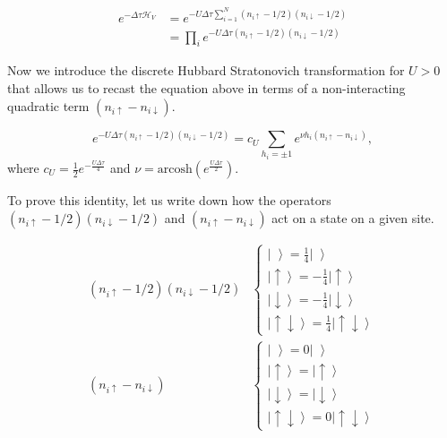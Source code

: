 \begin{equation}
\begin{split}
e^{-\Delta\tau \mathcal{H}_V} &= e^{-U \Delta\tau \sum_{i=1}^N (n_{i\uparrow} - 1/2 ) (n_{i\downarrow} - 1/2 )} \\
&= \prod_i e^{-U \Delta\tau (n_{i\uparrow} - 1/2 ) (n_{i\downarrow} - 1/2 )}
\end{split}
\end{equation}

Now we introduce the discrete Hubbard Stratonovich transformation for $U > 0$ that allows us to recast the equation above in terms of a non-interacting quadratic term $(n_{i\uparrow} - n_{i\downarrow} )$.

\begin{equation}\label{eq:discreteHS}
e^{-U \Delta\tau (n_{i\uparrow} - 1/2 ) (n_{i\downarrow} - 1/2 )} = c_U \sum_{h_i = \pm 1} e^{\nu h_i (n_{i\uparrow} - n_{i\downarrow} )},
\end{equation}
where $c_U = \frac{1}{2} e^{-\frac{U\Delta \tau}{4}}$ and $\nu = \text{arcosh} ( e^{\frac{U\Delta\tau}{2}})$.

To prove this identity, let us write down how the operators  $(n_{i\uparrow} - 1/2 ) (n_{i\downarrow} - 1/2 )$ and $(n_{i\uparrow} - n_{i\downarrow} )$ act on a state on a given site.

\begin{equation}
\begin{split}
(n_{i\uparrow} - 1/2 ) (n_{i\downarrow} - 1/2 )&
\begin{cases}
\left| \, \, \right\rangle = \frac{1}{4} \left| \, \, \right\rangle \\
\left| \uparrow \right\rangle = -\frac{1}{4} \left| \uparrow \right\rangle \\
\left| \downarrow \right\rangle = -\frac{1}{4} \left| \downarrow \right\rangle \\
\left| \uparrow \downarrow \right\rangle = \frac{1}{4} \left| \uparrow \downarrow \right\rangle
\end{cases}\\
(n_{i\uparrow} - n_{i\downarrow} )&
\begin{cases}
\left| \, \, \right\rangle = 0\left| \, \, \right\rangle \\
\left| \uparrow \right\rangle = \left| \uparrow \right\rangle \\
\left| \downarrow \right\rangle = \left| \downarrow \right\rangle \\
\left| \uparrow \downarrow \right\rangle = 0 \left| \uparrow \downarrow \right\rangle
\end{cases}
\end{split}
\end{equation}

